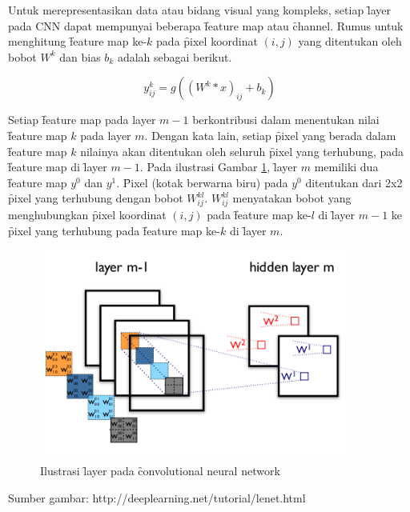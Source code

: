 Untuk merepresentasikan data atau bidang visual yang kompleks, setiap \f{layer} pada CNN dapat mempunyai beberapa \f{feature map} atau \f{channel}. Rumus untuk menghitung \f{feature map} ke-$k$ pada \f{pixel} koordinat $(i,j)$ yang ditentukan oleh bobot $W^{k}$ dan bias $b_{k}$ adalah sebagai berikut.

\begin{equation}
\label{equ:featuremap}
y^{k}_{ij} = g\left((W^{k} * x)_{ij} + b_{k}\right)
\end{equation}

Setiap \f{feature map} pada layer $m - 1$ berkontribusi dalam menentukan nilai \f{feature map} $k$ pada layer $m$. Dengan kata lain, setiap \f{pixel} yang berada dalam \f{feature map} $k$ nilainya akan ditentukan oleh seluruh \f{pixel} yang terhubung, pada \f{feature map} di \f{layer} $m - 1$. Pada ilustrasi Gambar \ref{fig:featuremap}, \f{layer} $m$ memiliki dua \f{feature map} $y^0$ dan $y^1$. \f{Pixel} (kotak berwarna biru) pada $y^0$ ditentukan dari 2x2 \f{pixel} yang terhubung dengan bobot $W^{kl}_{ij}$. $W^{kl}_{ij}$ menyatakan bobot yang menghubungkan \f{pixel} koordinat $(i,j)$ pada \f{feature map} ke-$l$ di \f{layer} $m - 1$ ke \f{pixel} yang terhubung pada \f{feature map} ke-$k$ di \f{layer} $m$.

\begin{figure}
	\centering
	\includegraphics[width=0.9\textwidth,height=0.55\textwidth]
	{pics/featuremap.png}
	\caption{Ilustrasi \f{layer} pada \f{convolutional neural network}}
	\label{fig:featuremap}
\end{figure}
\vspace{-1.2cm}
\begin{center}
	{\small Sumber gambar: http://deeplearning.net/tutorial/lenet.html}
\end{center}


